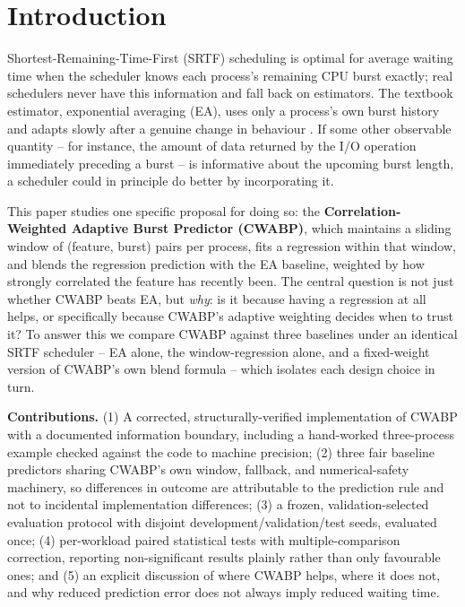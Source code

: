 \documentclass[10pt,twocolumn]{article}
\begin{document}
\section{Introduction}
Shortest-Remaining-Time-First (SRTF) scheduling is optimal for average waiting time when the scheduler knows each process's remaining CPU burst exactly; real schedulers never have this information and fall back on estimators. The textbook estimator, exponential averaging (EA), uses only a process's own burst history and adapts slowly after a genuine change in behaviour \cite{silberschatz2013}. If some other observable quantity -- for instance, the amount of data returned by the I/O operation immediately preceding a burst -- is informative about the upcoming burst length, a scheduler could in principle do better by incorporating it.

This paper studies one specific proposal for doing so: the \textbf{Correlation-Weighted Adaptive Burst Predictor (CWABP)}, which maintains a sliding window of (feature, burst) pairs per process, fits a regression within that window, and blends the regression prediction with the EA baseline, weighted by how strongly correlated the feature has recently been. The central question is not just whether CWABP beats EA, but \emph{why}: is it because having a regression at all helps, or specifically because CWABP's adaptive weighting decides when to trust it? To answer this we compare CWABP against three baselines under an identical SRTF scheduler -- EA alone, the window-regression alone, and a fixed-weight version of CWABP's own blend formula -- which isolates each design choice in turn.

\textbf{Contributions.} (1) A corrected, structurally-verified implementation of CWABP with a documented information boundary, including a hand-worked three-process example checked against the code to machine precision; (2) three fair baseline predictors sharing CWABP's own window, fallback, and numerical-safety machinery, so differences in outcome are attributable to the prediction rule and not to incidental implementation differences; (3) a frozen, validation-selected evaluation protocol with disjoint development/validation/test seeds, evaluated once; (4) per-workload paired statistical tests with multiple-comparison correction, reporting non-significant results plainly rather than only favourable ones; and (5) an explicit discussion of where CWABP helps, where it does not, and why reduced prediction error does not always imply reduced waiting time.
\end{document}
